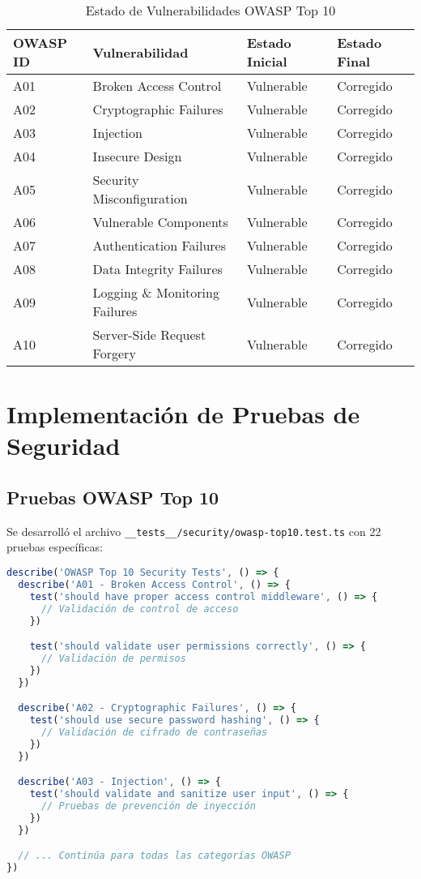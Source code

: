 \documentclass[12pt,a4paper]{article}
\begin{document}
\begin{table}[H]
\centering
\begin{tabularx}{\textwidth}{|l|X|l|l|}
\hline
\textbf{OWASP ID} & \textbf{Vulnerabilidad} & \textbf{Estado Inicial} & \textbf{Estado Final} \\
\hline
A01 & Broken Access Control & Vulnerable & Corregido \\
\hline
A02 & Cryptographic Failures & Vulnerable & Corregido \\
\hline
A03 & Injection & Vulnerable & Corregido \\
\hline
A04 & Insecure Design & Vulnerable & Corregido \\
\hline
A05 & Security Misconfiguration & Vulnerable & Corregido \\
\hline
A06 & Vulnerable Components & Vulnerable & Corregido \\
\hline
A07 & Authentication Failures & Vulnerable & Corregido \\
\hline
A08 & Data Integrity Failures & Vulnerable & Corregido \\
\hline
A09 & Logging \& Monitoring Failures & Vulnerable & Corregido \\
\hline
A10 & Server-Side Request Forgery & Vulnerable & Corregido \\
\hline
\end{tabularx}
\caption{Estado de Vulnerabilidades OWASP Top 10}
\end{table}

\section{Implementación de Pruebas de Seguridad}

\subsection{Pruebas OWASP Top 10}

Se desarrolló el archivo \texttt{\_\_tests\_\_/security/owasp-top10.test.ts} con 22 pruebas específicas:

\begin{lstlisting}[language=TypeScript, caption=Estructura de Pruebas OWASP Top 10]
describe('OWASP Top 10 Security Tests', () => {
  describe('A01 - Broken Access Control', () => {
    test('should have proper access control middleware', () => {
      // Validación de control de acceso
    })

    test('should validate user permissions correctly', () => {
      // Validación de permisos
    })
  })

  describe('A02 - Cryptographic Failures', () => {
    test('should use secure password hashing', () => {
      // Validación de cifrado de contraseñas
    })
  })

  describe('A03 - Injection', () => {
    test('should validate and sanitize user input', () => {
      // Pruebas de prevención de inyección
    })
  })

  // ... Continúa para todas las categorías OWASP
})
\end{lstlisting}
\end{document}
